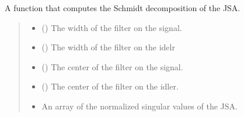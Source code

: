 \documentclass[a4paper,10pt,english]{sphinxmanual}
\begin{document}
\begin{fulllineitems}
\begin{fulllineitems}
\begin{quote}
\begin{description}
\end{description}\end{quote}

\end{fulllineitems}


\begin{fulllineitems}
\label{\detokenize{experiment:pyjsa.experiment.Experiment.schmidt_decomposition}}
\pysigstartsignatures
{}
\pysigstopsignatures
\sphinxAtStartPar
A function that computes the Schmidt decomposition of the JSA.
\begin{quote}\begin{description}
\begin{itemize}
\item {} 
\sphinxAtStartPar
{} () \textendash{} The width of the filter on the signal.

\item {} 
\sphinxAtStartPar
{} () \textendash{} The width of the filter on the idelr

\item {} 
\sphinxAtStartPar
{} () \textendash{} The center of the filter on the signal.

\item {} 
\sphinxAtStartPar
{} () \textendash{} The center of the filter on the idler.

\end{itemize}

\sphinxAtStartPar
\begin{itemize}
\item {} 
\sphinxAtStartPar
{} \textendash{} An array of the normalized singular values of the JSA.


\end{itemize}
\end{description}
\end{quote}
\end{fulllineitems}
\end{fulllineitems}
\end{document}
